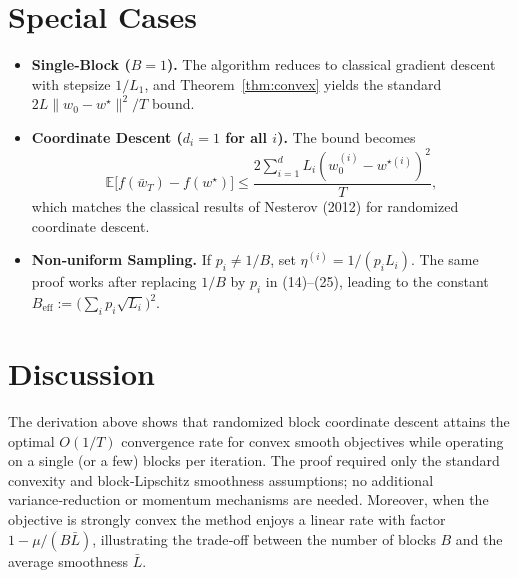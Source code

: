 \documentclass[11pt]{article}
\begin{document}
\section{Special Cases}
\begin{itemize}[leftmargin=*]
\item \textbf{Single‑Block ($B=1$).} The algorithm reduces to classical gradient
descent with stepsize $1/L_1$, and Theorem~\ref{thm:convex} yields the standard
$2L\|w_0-w^\star\|^{2}/T$ bound.
\item \textbf{Coordinate Descent ($d_i=1$ for all $i$).}
The bound becomes
\[
\mathbb{E}\!\bigl[f(\bar w_T)-f(w^\star)\bigr]
\le\frac{2\sum_{i=1}^{d}L_i (w_{0}^{(i)}-w^{\star(i)})^{2}}{T},
\]
which matches the classical results of Nesterov (2012) for randomized
coordinate descent.
\item \textbf{Non‑uniform Sampling.}
If $p_i\neq1/B$, set $\eta^{(i)}=1/(p_iL_i)$. The same proof works after replacing
$1/B$ by $p_i$ in (14)–(25), leading to the constant $B_{\text{eff}}:=\bigl(\sum_i p_i\sqrt{L_i}\bigr)^{2}$.
\end{itemize}

\section*{Discussion}
The derivation above shows that randomized block coordinate descent attains the
optimal $O(1/T)$ convergence rate for convex smooth objectives while operating
on a single (or a few) blocks per iteration.  The proof required only the
standard convexity and block‑Lipschitz smoothness assumptions; no additional
variance‑reduction or momentum mechanisms are needed.  Moreover, when the
objective is strongly convex the method enjoys a linear rate with factor
$1-\mu/(B\bar L)$, illustrating the trade‑off between the number of blocks $B$
and the average smoothness $\bar L$.
\end{document}
